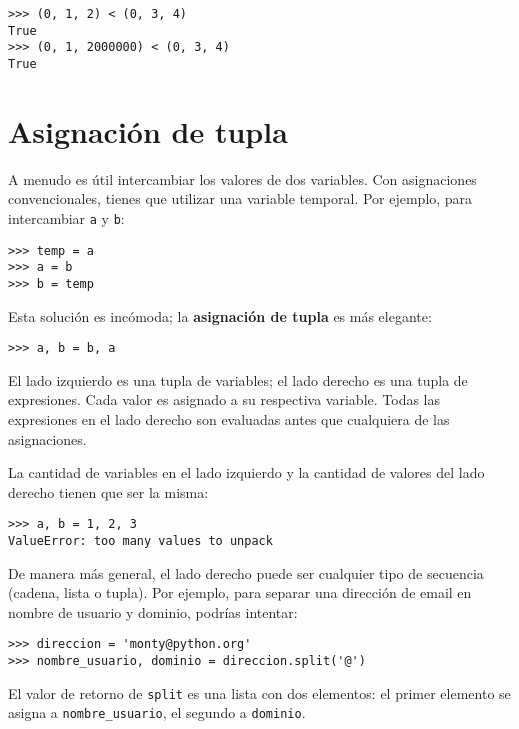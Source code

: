 \documentclass[10pt]{book}
\begin{document}
\begin{verbatim}
>>> (0, 1, 2) < (0, 3, 4)
True
>>> (0, 1, 2000000) < (0, 3, 4)
True
\end{verbatim}



\section{Asignación de tupla}
\label{tuple.assignment}

A menudo es útil intercambiar los valores de dos variables.
Con asignaciones convencionales, tienes que utilizar una variable
temporal.  Por ejemplo, para intercambiar {\tt a} y {\tt b}:

\begin{verbatim}
>>> temp = a
>>> a = b
>>> b = temp
\end{verbatim}
%
Esta solución es incómoda; la {\bf asignación de tupla} es más elegante:

\begin{verbatim}
>>> a, b = b, a
\end{verbatim}
%
El lado izquierdo es una tupla de variables; el lado derecho es una tupla de
expresiones.  Cada valor es asignado a su respectiva variable.
Todas las expresiones en el lado derecho son evaluadas antes que cualquiera
de las asignaciones.

La cantidad de variables en el lado izquierdo y la cantidad de valores del
lado derecho tienen que ser la misma:

\begin{verbatim}
>>> a, b = 1, 2, 3
ValueError: too many values to unpack
\end{verbatim}
%
De manera más general, el lado derecho puede ser cualquier tipo de secuencia
(cadena, lista o tupla).  Por ejemplo, para separar una dirección de email
en nombre de usuario y dominio, podrías intentar:

\begin{verbatim}
>>> direccion = 'monty@python.org'
>>> nombre_usuario, dominio = direccion.split('@')
\end{verbatim}
%
El valor de retorno de {\tt split} es una lista con dos elementos:
el primer elemento se asigna a {\tt nombre\_usuario}, el segundo a
{\tt dominio}.
\end{document}
